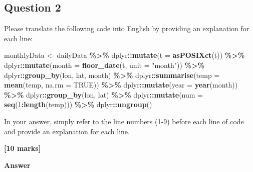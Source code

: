 \documentclass[
  10t,
]{article}
\newenvironment{Shaded}{\begin{snugshade}}{\end{snugshade}}
\newcommand{\AttributeTok}[1]{\textcolor[rgb]{0.13,0.29,0.53}{#1}}
\newcommand{\ConstantTok}[1]{\textcolor[rgb]{0.56,0.35,0.01}{#1}}
\newcommand{\DecValTok}[1]{\textcolor[rgb]{0.00,0.00,0.81}{#1}}
\newcommand{\FunctionTok}[1]{\textcolor[rgb]{0.13,0.29,0.53}{\textbf{#1}}}
\newcommand{\NormalTok}[1]{#1}
\newcommand{\OtherTok}[1]{\textcolor[rgb]{0.56,0.35,0.01}{#1}}
\newcommand{\SpecialCharTok}[1]{\textcolor[rgb]{0.81,0.36,0.00}{\textbf{#1}}}
\newcommand{\StringTok}[1]{\textcolor[rgb]{0.31,0.60,0.02}{#1}}
\begin{document}
\subsection{Question 2}\label{question-2}

Please translate the following code into English by providing an
explanation for each line:

\begin{Shaded}
\begin{Highlighting}[]
\NormalTok{monthlyData }\OtherTok{\textless{}{-}}\NormalTok{ dailyData }\SpecialCharTok{\%\textgreater{}\%}
\NormalTok{    dplyr}\SpecialCharTok{::}\FunctionTok{mutate}\NormalTok{(}\AttributeTok{t =} \FunctionTok{asPOSIXct}\NormalTok{(t)) }\SpecialCharTok{\%\textgreater{}\%}
\NormalTok{    dplyr}\SpecialCharTok{::}\FunctionTok{mutate}\NormalTok{(}\AttributeTok{month =} \FunctionTok{floor\_date}\NormalTok{(t, }\AttributeTok{unit =} \StringTok{"month"}\NormalTok{)) }\SpecialCharTok{\%\textgreater{}\%}
\NormalTok{    dplyr}\SpecialCharTok{::}\FunctionTok{group\_by}\NormalTok{(lon, lat, month) }\SpecialCharTok{\%\textgreater{}\%}
\NormalTok{    dplyr}\SpecialCharTok{::}\FunctionTok{summarise}\NormalTok{(}\AttributeTok{temp =} \FunctionTok{mean}\NormalTok{(temp, }\AttributeTok{na.rm =} \ConstantTok{TRUE}\NormalTok{)) }\SpecialCharTok{\%\textgreater{}\%}
\NormalTok{    dplyr}\SpecialCharTok{::}\FunctionTok{mutate}\NormalTok{(}\AttributeTok{year =} \FunctionTok{year}\NormalTok{(month)) }\SpecialCharTok{\%\textgreater{}\%}
\NormalTok{    dplyr}\SpecialCharTok{::}\FunctionTok{group\_by}\NormalTok{(lon, lat) }\SpecialCharTok{\%\textgreater{}\%}
\NormalTok{    dplyr}\SpecialCharTok{::}\FunctionTok{mutate}\NormalTok{(}\AttributeTok{num =} \FunctionTok{seq}\NormalTok{(}\DecValTok{1}\SpecialCharTok{:}\FunctionTok{length}\NormalTok{(temp))) }\SpecialCharTok{\%\textgreater{}\%}
\NormalTok{    dplyr}\SpecialCharTok{::}\FunctionTok{ungroup}\NormalTok{()}
\end{Highlighting}
\end{Shaded}

In your answer, simply refer to the line numbers (1-9) before each line
of code and provide an explanation for each line.

\textbf{{[}10 marks{]}}

\textbf{Answer}
\end{document}
